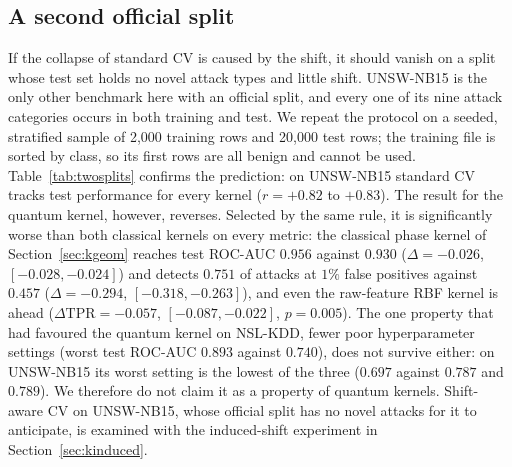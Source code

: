 \documentclass[preprint,11pt]{elsarticle}
\newcommand{\tpr}{\mathrm{TPR}}
\begin{document}
\subsection{A second official split}\label{sec:kunsw}
If the collapse of standard CV is caused by the shift, it should vanish on a split whose test set holds
no novel attack types and little shift. UNSW-NB15 is the only other benchmark here with an official split, and every one of its
nine attack categories occurs in both training and test. We repeat the protocol on a seeded, stratified
sample of 2{,}000 training rows and 20{,}000 test rows; the training file is sorted by class, so its first
rows are all benign and cannot be used. Table~\ref{tab:twosplits} confirms the prediction: on UNSW-NB15
standard CV tracks test performance for every kernel ($r=+0.82$ to $+0.83$). The result for the quantum
kernel, however, reverses. Selected by the same rule, it is significantly worse than both classical kernels
on every metric: the classical phase kernel of Section~\ref{sec:kgeom} reaches test ROC-AUC $0.956$ against
$0.930$ ($\Delta=-0.026$, $[-0.028,-0.024]$) and detects $0.751$ of attacks at $1\%$ false positives against
$0.457$ ($\Delta=-0.294$, $[-0.318,-0.263]$), and even the raw-feature RBF kernel is ahead ($\Delta\tpr=-0.057$,
$[-0.087,-0.022]$, $p=0.005$). The one property that had favoured the quantum kernel on NSL-KDD, fewer poor
hyperparameter settings (worst test ROC-AUC $0.893$ against $0.740$), does not survive either: on
UNSW-NB15 its worst setting is the lowest of the three ($0.697$ against $0.787$ and $0.789$). We therefore do
not claim it as a property of quantum kernels. Shift-aware CV on UNSW-NB15, whose official split has no
novel attacks for it to anticipate, is examined with the induced-shift experiment in
Section~\ref{sec:kinduced}.
\end{document}
